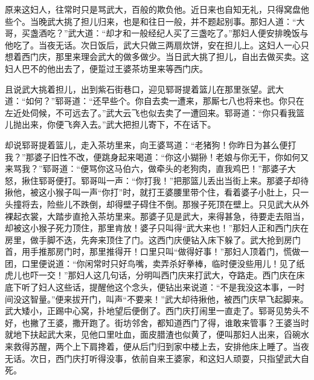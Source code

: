 原来这妇人，往常时只是骂武大，百般的欺负他。近日来也自知无礼，只得窝盘他些个。当晚武大挑了担儿归来，也是和往日一般，并不题起别事。那妇人道：“大哥，买盏酒吃？”武大道：“却才和一般经纪人买了三盏吃了。”那妇人便安排晚饭与他吃了。当夜无话。次日饭后，武大只做三两扇炊饼，安在担儿上。这妇人一心只想着西门庆，那里来理会武大的做多做少。当日武大挑了担儿，自出去做买卖。这妇人巴不的他出去了，便踅过王婆茶坊里来等西门庆。

且说武大挑着担儿，出到紫石街巷口，迎见郓哥提着篮儿在那里张望。武大道：“如何？”郓哥道：“还早些个。你自去卖一遭来，那厮七八也将来也。你只在左近处伺候，不可远去了。”武大云飞也似去卖了一遭回来。郓哥道：“你只看我篮儿抛出来，你便飞奔入去。”武大把担儿寄下，不在话下。

却说郓哥提着篮儿，走入茶坊里来，向王婆骂道：“老猪狗！你昨日为甚么便打我？”那婆子旧性不改，便跳身起来喝道：“你这小猢狲！老娘与你无干，你如何又来骂我？”郓哥道：“便骂你这马伯六，做牵头的老狗肉，直我鸡巴！”那婆子大怒，揪住郓哥便打。郓哥叫一声：“你打我！”把那篮儿丢出当街上来。那婆子却待揪他，被这小猴子叫一声“你打”时，就打王婆腰里带个住，看着婆子小肚上，只一头撞将去，险些儿不跌倒，却得壁子碍住不倒。那猴子死顶在壁上。只见武大从外裸起衣裳，大踏步直抢入茶坊里来。那婆子见是武大，来得甚急，待要走去阻当，却被这小猴子死力顶住，那里肯放！婆子只叫得“武大来也！”那妇人正和西门庆在房里，做手脚不迭，先奔来顶住了门。这西门庆便钻入床下躲了。武大抢到房门首，用手推那房门时，那里推得开！口里只叫“做得好事！”那妇人顶着门，慌做一团，口里便说道：“你闲常时只好鸟嘴，卖弄杀好拳棒，临时便没些用儿！见了纸虎儿也吓一交！”那妇人这几句话，分明叫西门庆来打武大，夺路走。西门庆在床底下听了妇人这些话，提醒他这个念头，便钻出来说道：“不是我没这本事，一时间没这智量。”便来拔开门，叫声“不要来！”武大却待揪他，被西门庆早飞起脚来。武大矮小，正踢中心窝，扑地望后便倒了。西门庆打闹里一直走了。郓哥见势头不好，也撇了王婆，撒开跑了。街坊邻舍，都知道西门了得，谁敢来管事？王婆当时就地下扶起武大来，见他口里吐血，面皮腊渣也似黄了，便叫那妇人出来，舀碗水来救得苏醒，两个上下肩搀着，便从后门归到家中楼上去，安排他床上睡了。当夜无话。次日，西门庆打听得没事，依前自来王婆家，和这妇人顽耍，只指望武大自死。

